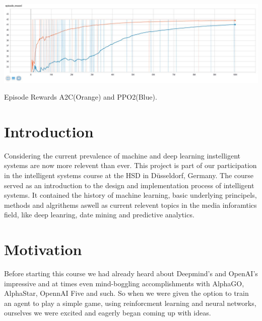 \documentclass[sigconf]{acmart}
\begin{document}
\begin{teaserfigure}
 \includegraphics[width=\textwidth]{episode_reward_big} %
  \caption{Episode Rewards A2C(Orange) and PPO2(Blue).}
  \label{fig:teaser}
\end{teaserfigure}

\maketitle 

\section{Introduction}
Considering the current prevalence of machine and deep learning instelligent systems are now more relevent than ever.
This project is part of our participation in the intelligent systems course at the HSD in Düsseldorf, Germany. The course served as an introduction to the design and implementation process of intelligent systems. It contained the history of machine learning, basic underlying principels, methods and algrithems aswell as current relevent topics in the media inforamtics field, like deep leanring, date mining and predictive analytics. 
  
\section{Motivation}
Before starting this course we had already heard  about Deepmind's and OpenAI's impressive and at times even mind-boggling accomplishments with AlphaGO, AlphaStar, OpennAI Five and such. So when we were given the option to train an agent to play a simple game, using reinforcment learning and neural networks, ourselves we were excited and eagerly began coming up with ideas.
\end{document}
